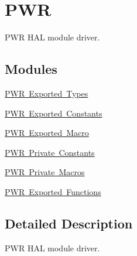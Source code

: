 \hypertarget{group___p_w_r}{}\section{P\+WR}
\label{group___p_w_r}


P\+WR H\+AL module driver.  


\subsection*{Modules}
\begin{DoxyCompactItemize}
\item 
\mbox{\hyperlink{group___p_w_r___exported___types}{P\+W\+R Exported Types}}
\item 
\mbox{\hyperlink{group___p_w_r___exported___constants}{P\+W\+R Exported Constants}}
\item 
\mbox{\hyperlink{group___p_w_r___exported___macro}{P\+W\+R Exported Macro}}
\item 
\mbox{\hyperlink{group___p_w_r___private___constants}{P\+W\+R Private Constants}}
\item 
\mbox{\hyperlink{group___p_w_r___private___macros}{P\+W\+R Private Macros}}
\item 
\mbox{\hyperlink{group___p_w_r___exported___functions}{P\+W\+R Exported Functions}}
\end{DoxyCompactItemize}


\subsection{Detailed Description}
P\+WR H\+AL module driver. 

